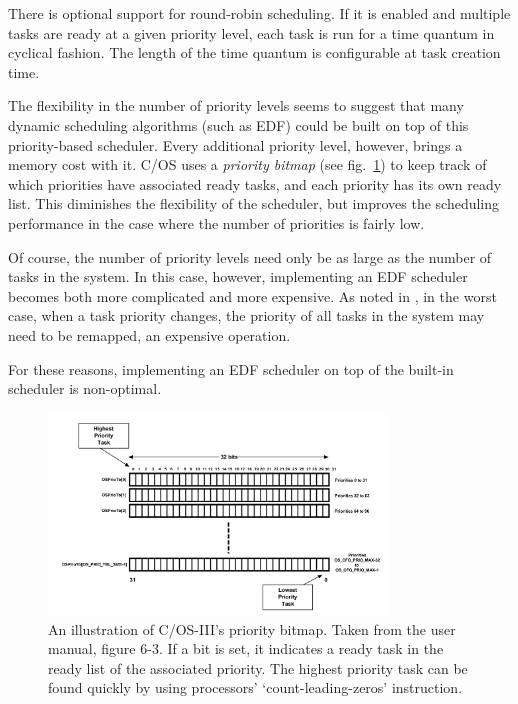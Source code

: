 \documentclass[twoside]{uva-inf-bachelor-thesis}
\newcommand{\ucosiii}{\textmu C/OS-III\xspace}
\newcommand{\ucos}{\textmu C/OS\xspace}
\begin{document}
There is optional support for round-robin scheduling. If it is enabled and multiple tasks are ready at a given priority level, each task is run for a time quantum in cyclical fashion. The length of the time quantum is configurable at task creation time.

The flexibility in the number of priority levels seems to suggest that many dynamic scheduling algorithms (such as EDF) could be built on top of this priority-based scheduler. Every additional priority level, however, brings a memory cost with it. \ucos uses a \textit{priority bitmap} (see fig.~\ref{fig:priobitmap}) to keep track of which priorities have associated ready tasks, and each priority has its own ready list. This diminishes the flexibility of the scheduler, but improves the scheduling performance in the case where the number of priorities is fairly low.

Of course, the number of priority levels need only be as large as the number of tasks in the system. In this case, however, implementing an EDF scheduler becomes both more complicated and more expensive. As noted in \textcite[\S 2]{Buttazzo2005}, in the worst case, when a task priority changes, the priority of all tasks in the system may need to be remapped, an expensive operation.

For these reasons, implementing an EDF scheduler on top of the built-in scheduler is non-optimal.

\begin{figure}[ht]
    \centering
    \includegraphics[width=0.8\textwidth]{priobitmap.png}
    \caption{An illustration of \ucosiii's priority bitmap. Taken from the user manual, figure 6-3. If a bit is set, it indicates a ready task in the ready list of the associated priority. The highest priority task can be found quickly by using processors' `count-leading-zeros' instruction.}
    \label{fig:priobitmap}
\end{figure}
\end{document}
